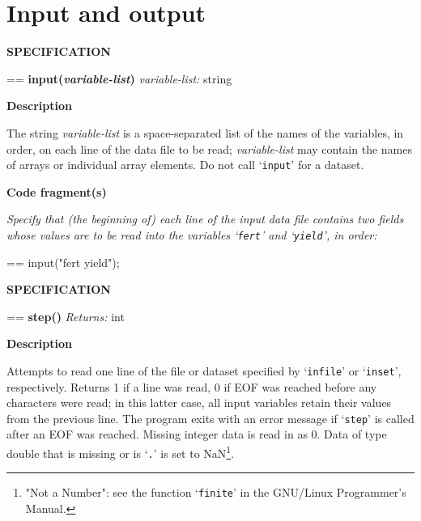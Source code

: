 \documentclass{book}
\makeatletter
\newcommand\Texinfocommandstyletextvar[1]{{\normalfont{}\textsl{#1}}}%
\newenvironment{Texinfopreformatted}{%
  \par\GNUTobeylines\obeyspaces\frenchspacing\parskip=\z@\parindent=\z@}{}
{\catcode`\^^M=13 \gdef\GNUTobeylines{\catcode`\^^M=13 \def^^M{\null\par}}}
\newenvironment{Texinfoindented}{\begin{list}{}{}\item\relax}{\end{list}}
\renewcommand{\_}{\Texinfounderscore\discretionary{}{}{}}
\makeatother
\begin{document}
\section{{Input and output}}
\label{anchor:Input-and-output}%

\noindent{}\textbf{SPECIFICATION}
\begin{Texinfoindented}
\begin{Texinfopreformatted}%
\textbf{input(\Texinfocommandstyletextvar{variable-list})}
\Texinfocommandstyletextvar{variable-list:} string
\end{Texinfopreformatted}
\end{Texinfoindented}
%

\noindent{}\textbf{Description}

The string \Texinfocommandstyletextvar{variable-list}
is a space-separated list of the names of the variables,
in order, on each line of the data file to be read;
\Texinfocommandstyletextvar{variable-list}
may contain the names of arrays or individual array elements.
Do not call `\texttt{input}' for a dataset.

\noindent{}\textbf{Code fragment(s)}

\emph{Specify that (the beginning of) each line of the
input data file contains two fields whose values are to
be read into the variables `\texttt{fert}' and `\texttt{yield}',
in order:}
\begin{Texinfoindented}
\begin{Texinfopreformatted}%
\ttfamily input("fert yield");
\end{Texinfopreformatted}
\end{Texinfoindented}

\noindent{}\textbf{SPECIFICATION}
\begin{Texinfoindented}
\begin{Texinfopreformatted}%
\textbf{step()}
\Texinfocommandstyletextvar{Returns:} int
\end{Texinfopreformatted}
\end{Texinfoindented}
%
%

\noindent{}\textbf{Description}

Attempts to read one line of the file or dataset specified by `\texttt{infile}'
or `\texttt{inset}', respectively.
Returns 1 if a line was read, 0 if EOF
%
%
was reached before any characters
were read; in this latter case, all input variables retain their
values from the previous line.
The program exits with an error message if
`\texttt{step}' is called after an EOF was reached.
Missing integer
%
data is read in as 0.
Data of type double that is missing or is `\texttt{.}' is set to
NaN\footnote{"Not a Number": see the function `\texttt{finite}'
in the GNU/Linux Programmer's Manual.}.
%
\end{document}
